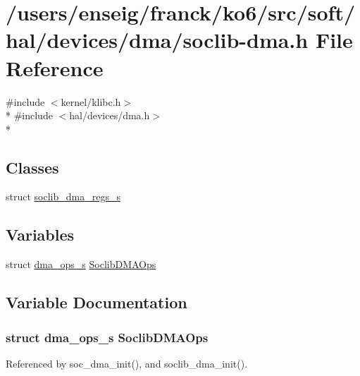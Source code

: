 \hypertarget{soclib-dma_8h}{\section{/users/enseig/franck/ko6/src/soft/hal/devices/dma/soclib-\/dma.h File Reference}
\label{soclib-dma_8h}
}
{\ttfamily \#include $<$kernel/klibc.\-h$>$}\\*
{\ttfamily \#include $<$hal/devices/dma.\-h$>$}\\*
\subsection*{Classes}
\begin{DoxyCompactItemize}
\item 
struct \hyperlink{structsoclib__dma__regs__s}{soclib\-\_\-dma\-\_\-regs\-\_\-s}
\end{DoxyCompactItemize}
\subsection*{Variables}
\begin{DoxyCompactItemize}
\item 
struct \hyperlink{structdma__ops__s}{dma\-\_\-ops\-\_\-s} \hyperlink{soclib-dma_8h_a80351df0b0525153b84f567f1d5c77d1}{Soclib\-D\-M\-A\-Ops}
\end{DoxyCompactItemize}


\subsection{Variable Documentation}
\hypertarget{soclib-dma_8h_a80351df0b0525153b84f567f1d5c77d1}{
\subsubsection[{Soclib\-D\-M\-A\-Ops}]{\setlength{\rightskip}{0pt plus 5cm}struct {\bf dma\-\_\-ops\-\_\-s} Soclib\-D\-M\-A\-Ops}}\label{soclib-dma_8h_a80351df0b0525153b84f567f1d5c77d1}


Referenced by soc\-\_\-dma\-\_\-init(), and soclib\-\_\-dma\-\_\-init().

